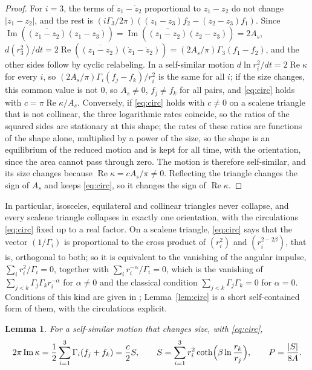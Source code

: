 \documentclass[11pt]{article}
\newtheorem{lemma}{Lemma}
\theoremstyle{definition}
\newcommand{\re}{\operatorname{Re}}
\newcommand{\im}{\operatorname{Im}}
\begin{document}
\begin{proof}
For $i = 3$, the terms of $\dot z_1 - \dot z_2$ proportional to $z_1 - z_2$ do not change $|z_1 - z_2|$, and the rest is $(i\Gamma_3/2\pi)((z_1 - z_3) f_2 - (z_2 - z_3) f_1)$. Since $\im(\overline{(z_1 - z_2)}(z_1 - z_3)) = \im(\overline{(z_1 - z_2)}(z_2 - z_3)) = 2A_s$, $d(r_3^2)/dt = 2\re(\overline{(z_1 - z_2)}(\dot z_1 - \dot z_2)) = (2A_s/\pi)\Gamma_3(f_1 - f_2)$, and the other sides follow by cyclic relabeling. In a self-similar motion $d\ln r_i^2/dt = 2\re\kappa$ for every $i$, so $(2A_s/\pi)\Gamma_i(f_j - f_k)/r_i^2$ is the same for all $i$; if the size changes, this common value is not $0$, so $A_s \ne 0$, $f_j \ne f_k$ for all pairs, and \eqref{eq:circ} holds with $c = \pi\re\kappa/A_s$. Conversely, if \eqref{eq:circ} holds with $c \ne 0$ on a scalene triangle that is not collinear, the three logarithmic rates coincide, so the ratios of the squared sides are stationary at this shape; the rates of these ratios are functions of the shape alone, multiplied by a power of the size, so the shape is an equilibrium of the reduced motion and is kept for all time, with the orientation, since the area cannot pass through zero. The motion is therefore self-similar, and its size changes because $\re\kappa = cA_s/\pi \ne 0$. Reflecting the triangle changes the sign of $A_s$ and keeps \eqref{eq:circ}, so it changes the sign of $\re\kappa$.
\end{proof}

In particular, isosceles, equilateral and collinear triangles never collapse, and every scalene triangle collapses in exactly one orientation, with the circulations \eqref{eq:circ} fixed up to a real factor. On a scalene triangle, \eqref{eq:circ} says that the vector $(1/\Gamma_i)$ is proportional to the cross product of $(r_i^2)$ and $(r_i^{2 - 2\beta})$, that is, orthogonal to both; so it is equivalent to the vanishing of the angular impulse, $\sum_i r_i^2/\Gamma_i = 0$, together with $\sum_i r_i^{-\alpha}/\Gamma_i = 0$, which is the vanishing of $\sum_{j<k}\Gamma_j\Gamma_k r_i^{-\alpha}$ for $\alpha \ne 0$ and the classical condition $\sum_{j<k}\Gamma_j\Gamma_k = 0$ for $\alpha = 0$. Conditions of this kind are given in \cite{bb2018,cl2024,gp2025,reinaud2021,rds2022}; Lemma~\ref{lem:circ} is a short self-contained form of them, with the circulations explicit.

\begin{lemma}\label{lem:rates}
For a self-similar motion that changes size, with \eqref{eq:circ},
\begin{equation}\label{eq:S}
2\pi\im\kappa = \frac12 \sum_{i=1}^3 \Gamma_i (f_j + f_k) = \frac{c}{2} S, \qquad S = \sum_{i=1}^3 r_i^2 \coth\Bigl(\beta\ln\frac{r_k}{r_j}\Bigr), \qquad P = \frac{|S|}{8A}.
\end{equation}
\end{lemma}
\end{document}
